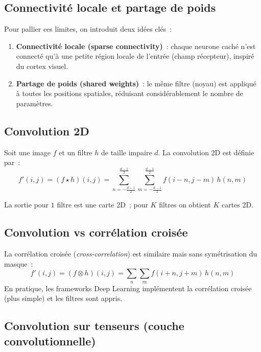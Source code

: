 \documentclass[a4paper,11pt]{article}
\theoremstyle{definition}
\theoremstyle{remark}
\begin{document}
\subsection{Connectivit\'e locale et partage de poids}

Pour pallier ces limites, on introduit deux id\'ees cl\'es~:

\begin{enumerate}
  \item \textbf{Connectivit\'e locale (sparse connectivity)}~:
    chaque neurone cach\'e n'est connect\'e qu'\`a une petite r\'egion
    locale de l'entr\'ee (champ r\'ecepteur), inspir\'e du cortex
    visuel.
  \item \textbf{Partage de poids (shared weights)}~: le m\^eme filtre
    (noyau) est appliqu\'e \`a toutes les positions spatiales,
    r\'eduisant consid\'erablement le nombre de param\`etres.
\end{enumerate}

\subsection{Convolution 2D}

Soit une image $f$ et un filtre $h$ de taille impaire $d$. La
convolution 2D est d\'efinie par~:
\begin{equation}
  f'(i,j) = (f \star h)(i,j) =
  \sum_{n=-\frac{d-1}{2}}^{\frac{d-1}{2}}
  \sum_{m=-\frac{d-1}{2}}^{\frac{d-1}{2}}
  f(i-n, j-m)\,h(n,m)
\end{equation}

\noindent La sortie pour $1$ filtre est une carte 2D~; pour $K$
filtres on obtient $K$ cartes 2D.

\subsection{Convolution vs corr\'elation crois\'ee}

La corr\'elation crois\'ee (\emph{cross-correlation}) est
similaire mais sans sym\'etrisation du masque~:
\begin{equation}
  f'(i,j) = (f \otimes h)(i,j) =
  \sum_{n}\sum_{m} f(i+n, j+m)\,h(n,m)
\end{equation}
En pratique, les frameworks Deep Learning impl\'ementent la
corr\'elation crois\'ee (plus simple) et les filtres sont appris.

\subsection{Convolution sur tenseurs (couche convolutionnelle)}
\end{document}
